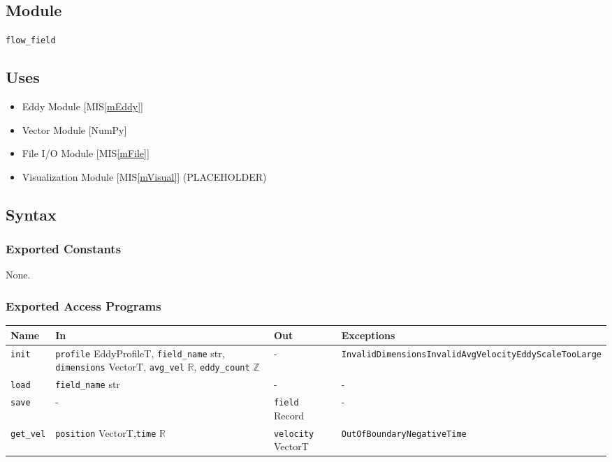 \documentclass[12pt, titlepage]{article}
\begin{document}
\subsection{Module}
\texttt{flow\_field}

\subsection{Uses}
\begin{itemize}
\item Eddy Module [MIS\ref{mEddy}]
\item Vector Module [NumPy]
\item File I/O Module [MIS\ref{mFile}]
\item Visualization Module [MIS\ref{mVisual}] (PLACEHOLDER)
\end{itemize}

\subsection{Syntax}

\subsubsection{Exported Constants}
None.

\subsubsection{Exported Access Programs}

\begin{center}
\begin{tabular}{p{2cm} p{4.5cm} p{3.5cm} p{4cm}}
\hline
\textbf{Name} & \textbf{In} & \textbf{Out} & \textbf{Exceptions} \\
\hline
\texttt{init} & \texttt{profile} EddyProfileT, \newline\texttt{field\_name} str, \newline\texttt{dimensions} VectorT, \newline\texttt{avg\_vel} $\mathbb{R}$, \newline\texttt{eddy\_count} $\mathbb{Z}$ & - & \texttt{InvalidDimensions}\newline\texttt{InvalidAvgVelocity}\newline\texttt{EddyScaleTooLarge}\\
\texttt{load} & \texttt{field\_name} str & - & -  \\
\texttt{save} & - & \texttt{field} Record & -  \\
\texttt{get\_vel}& \texttt{position} VectorT,\newline\texttt{time} $\mathbb{R}$ & \texttt{velocity} VectorT & \texttt{OutOfBoundary}\newline\texttt{NegativeTime} \\
\hline
\end{tabular}
\end{center}
\end{document}
